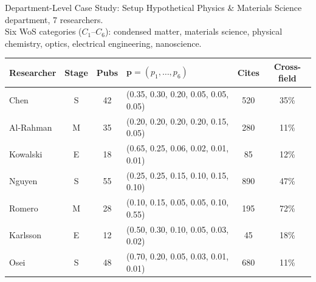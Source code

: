 \documentclass[aspectratio=169,10pt]{beamer}
\begin{document}
\begin{frame}{Department-Level Case Study: Setup}
Hypothetical Physics \& Materials Science department, 7 researchers.\\
Six WoS categories ($C_1$--$C_6$): condensed matter, materials science,
physical chemistry, optics, electrical engineering, nanoscience.
\medskip
\begin{table}
\centering\scriptsize
\begin{tabular}{@{}l c c l c c@{}}
\toprule
\textbf{Researcher} & \textbf{Stage} & \textbf{Pubs}
  & $\mathbf{p}=(p_1,\ldots,p_6)$ & \textbf{Cites} & \textbf{Cross-field} \\
\midrule
Chen      & S & 42 & (0.35, 0.30, 0.20, 0.05, 0.05, 0.05) & 520 & 35\% \\
Al-Rahman & M & 35 & (0.20, 0.20, 0.20, 0.20, 0.15, 0.05) & 280 & 11\% \\
Kowalski  & E & 18 & (0.65, 0.25, 0.06, 0.02, 0.01, 0.01) &  85 & 12\% \\
Nguyen    & S & 55 & (0.25, 0.25, 0.15, 0.10, 0.15, 0.10) & 890 & 47\% \\
Romero    & M & 28 & (0.10, 0.15, 0.05, 0.05, 0.10, 0.55) & 195 & 72\% \\
Karlsson  & E & 12 & (0.50, 0.30, 0.10, 0.05, 0.03, 0.02) &  45 & 18\% \\
Osei      & S & 48 & (0.70, 0.20, 0.05, 0.03, 0.01, 0.01) & 680 & 11\% \\
\bottomrule
\end{tabular}
\end{table}
\end{frame}
\end{document}

